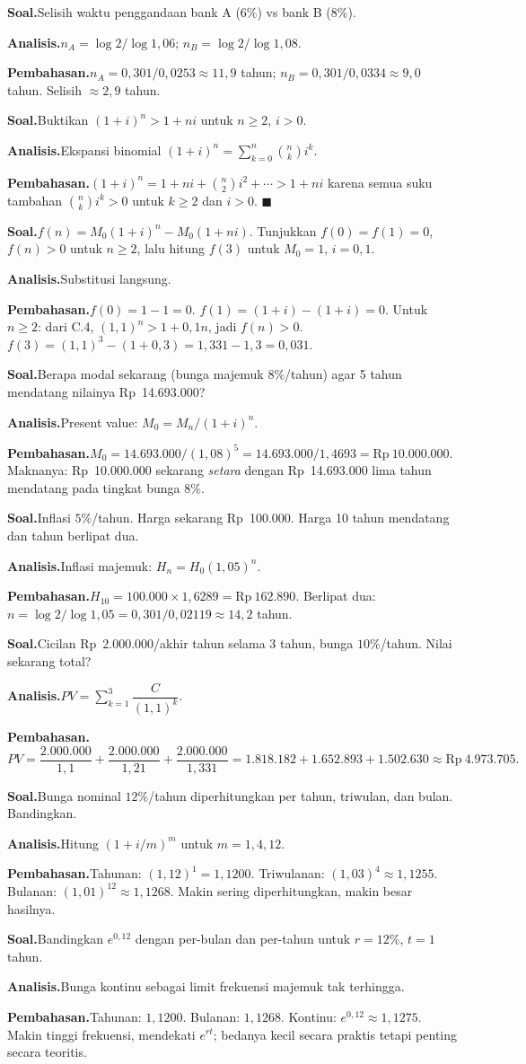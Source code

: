 \documentclass[11pt,a4paper]{report}
\theoremstyle{gaya}
\newcommand{\knomor}[1]{\par\medskip\noindent{\bfseries\color{ungu}#1}\par\nopagebreak}
\newcommand{\ksoal}{\noindent\textbf{\color{biru}Soal.}\space}
\newcommand{\kanalisis}{\par\noindent\textbf{\color{oranye}Analisis.}\space}
\newcommand{\kbahas}{\par\noindent\textbf{\color{hijau}Pembahasan.}\space}
\newcommand{\kbagian}[1]{\par\medskip\noindent{\large\bfseries\color{biru}#1}\par\smallskip}
\begin{document}
\knomor{C.3}
\ksoal Selisih waktu penggandaan bank A ($6\%$) vs bank B ($8\%$).
\kanalisis $n_A=\log2/\log1{,}06$; $n_B=\log2/\log1{,}08$.
\kbahas $n_A=0{,}301/0{,}0253\approx11{,}9$ tahun; $n_B=0{,}301/0{,}0334\approx9{,}0$ tahun. Selisih $\approx 2{,}9$ tahun.

\knomor{C.4}
\ksoal Buktikan $(1+i)^n > 1+ni$ untuk $n\ge2$, $i>0$.
\kanalisis Ekspansi binomial $(1+i)^n=\sum_{k=0}^n\binom{n}{k}i^k$.
\kbahas $(1+i)^n=1+ni+\binom{n}{2}i^2+\cdots>1+ni$ karena semua suku tambahan $\binom{n}{k}i^k>0$ untuk $k\ge2$ dan $i>0$. $\blacksquare$

\knomor{C.5}
\ksoal $f(n)=M_0(1+i)^n-M_0(1+ni)$. Tunjukkan $f(0)=f(1)=0$, $f(n)>0$ untuk $n\ge2$, lalu hitung $f(3)$ untuk $M_0=1$, $i=0{,}1$.
\kanalisis Substitusi langsung.
\kbahas $f(0)=1-1=0$. $f(1)=(1+i)-(1+i)=0$. Untuk $n\ge2$: dari C.4, $(1{,}1)^n>1+0{,}1n$, jadi $f(n)>0$. $f(3)=(1{,}1)^3-(1+0{,}3)=1{,}331-1{,}3=0{,}031.$

\kbagian{Bagian D}

\knomor{D.1}
\ksoal Berapa modal sekarang (bunga majemuk $8\%$/tahun) agar 5 tahun mendatang nilainya Rp~14.693.000?
\kanalisis Present value: $M_0=M_n/(1+i)^n$.
\kbahas $M_0=14.693.000/(1{,}08)^5=14.693.000/1{,}4693=\text{Rp}\ 10.000.000.$ Maknanya: Rp~10.000.000 sekarang \emph{setara} dengan Rp~14.693.000 lima tahun mendatang pada tingkat bunga $8\%$.

\knomor{D.2}
\ksoal Inflasi $5\%$/tahun. Harga sekarang Rp~100.000. Harga 10 tahun mendatang dan tahun berlipat dua.
\kanalisis Inflasi majemuk: $H_n=H_0(1{,}05)^n$.
\kbahas $H_{10}=100.000\times1{,}6289=\text{Rp}\ 162.890$. Berlipat dua: $n=\log2/\log1{,}05=0{,}301/0{,}02119\approx14{,}2$ tahun.

\knomor{D.3}
\ksoal Cicilan Rp~2.000.000/akhir tahun selama 3 tahun, bunga $10\%$/tahun. Nilai sekarang total?
\kanalisis $PV=\sum_{k=1}^{3}\dfrac{C}{(1{,}1)^k}$.
\kbahas $PV=\dfrac{2.000.000}{1{,}1}+\dfrac{2.000.000}{1{,}21}+\dfrac{2.000.000}{1{,}331}=1.818.182+1.652.893+1.502.630\approx\text{Rp}\ 4.973.705.$

\knomor{D.4}
\ksoal Bunga nominal $12\%$/tahun diperhitungkan per tahun, triwulan, dan bulan. Bandingkan.
\kanalisis Hitung $(1+i/m)^m$ untuk $m=1,4,12$.
\kbahas Tahunan: $(1{,}12)^1=1{,}1200$. Triwulanan: $(1{,}03)^4\approx1{,}1255$. Bulanan: $(1{,}01)^{12}\approx1{,}1268$. Makin sering diperhitungkan, makin besar hasilnya.

\knomor{D.5}
\ksoal Bandingkan $e^{0{,}12}$ dengan per-bulan dan per-tahun untuk $r=12\%$, $t=1$ tahun.
\kanalisis Bunga kontinu sebagai limit frekuensi majemuk tak terhingga.
\kbahas Tahunan: $1{,}1200$. Bulanan: $1{,}1268$. Kontinu: $e^{0{,}12}\approx1{,}1275$. Makin tinggi frekuensi, mendekati $e^{rt}$; bedanya kecil secara praktis tetapi penting secara teoritis.
\end{document}
